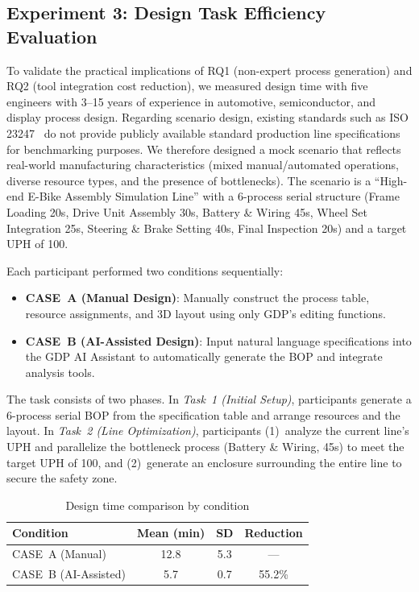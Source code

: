 \documentclass[conference]{IEEEtran}
\begin{document}
\subsection{Experiment 3: Design Task Efficiency Evaluation}

To validate the practical implications of RQ1 (non-expert process generation) and RQ2 (tool integration cost reduction), we measured design time with five engineers with 3--15 years of experience in automotive, semiconductor, and display process design. Regarding scenario design, existing standards such as ISO 23247~\cite{b3} do not provide publicly available standard production line specifications for benchmarking purposes. We therefore designed a mock scenario that reflects real-world manufacturing characteristics (mixed manual/automated operations, diverse resource types, and the presence of bottlenecks). The scenario is a ``High-end E-Bike Assembly Simulation Line'' with a 6-process serial structure (Frame Loading 20s, Drive Unit Assembly 30s, Battery \& Wiring 45s, Wheel Set Integration 25s, Steering \& Brake Setting 40s, Final Inspection 20s) and a target UPH of 100.

Each participant performed two conditions sequentially:
\begin{itemize}
\item \textbf{CASE~A (Manual Design)}: Manually construct the process table, resource assignments, and 3D layout using only GDP's editing functions.
\item \textbf{CASE~B (AI-Assisted Design)}: Input natural language specifications into the GDP AI Assistant to automatically generate the BOP and integrate analysis tools.
\end{itemize}

The task consists of two phases. In \textit{Task~1 (Initial Setup)}, participants generate a 6-process serial BOP from the specification table and arrange resources and the layout. In \textit{Task~2 (Line Optimization)}, participants (1)~analyze the current line's UPH and parallelize the bottleneck process (Battery \& Wiring, 45s) to meet the target UPH of 100, and (2)~generate an enclosure surrounding the entire line to secure the safety zone.

\begin{table}[!t]
\caption{Design time comparison by condition}
\label{tab:design_time}
\centering
\begin{tabular}{l c c c}
\hline
\textbf{Condition} & \textbf{Mean (min)} & \textbf{SD} & \textbf{Reduction} \\
\hline
CASE~A (Manual) & 12.8 & 5.3 & --- \\
CASE~B (AI-Assisted) & 5.7 & 0.7 & 55.2\% \\
\hline
\end{tabular}
\end{table}
\end{document}
